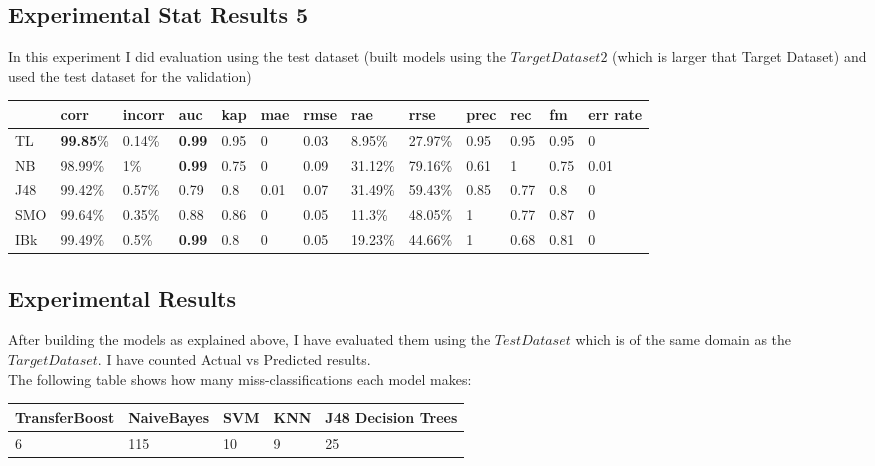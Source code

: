 \documentclass[a4paper,12pt, english]{article}
\begin{document}
\subsection{Experimental Stat Results 5}
In this experiment I did evaluation using the test dataset (built models using the $Target Dataset2$ (which is larger that Target Dataset) and used the test dataset for the validation)
\begin{small}
\begin{center}
    \begin{tabular}{ | l | l | l | l | l | l | l | l | l | l | l | l | l |}
    \hline
	& corr & incorr  & auc & kap & mae & rmse & rae & rrse & prec & rec & fm & err rate\\ \hline    
	TL & \textbf{99.85}\% & 0.14\% & \textbf{0.99} & 0.95 & 0 & 0.03 & 8.95\% & 27.97\% & 0.95 & 0.95 & 0.95 & 0\\ \hline  
	NB & 98.99\% & 1\% & \textbf{0.99} & 0.75 & 0 & 0.09 & 31.12\% & 79.16\% & 0.61 & 1 & 0.75 & 0.01\\ \hline  
	J48 & 99.42\% & 0.57\% & 0.79 & 0.8 & 0.01 & 0.07 & 31.49\% & 59.43\% & 0.85 & 0.77 & 0.8 & 0\\ \hline  
	SMO & 99.64\% & 0.35\% & 0.88 & 0.86 & 0 & 0.05 & 11.3\% & 48.05\% & 1 & 0.77 & 0.87 & 0\\ \hline  
	IBk & 99.49\% & 0.5\% & \textbf{0.99} & 0.8 & 0 & 0.05 & 19.23\% & 44.66\% & 1 & 0.68 & 0.81 & 0 \\ \hline  		    
    \end{tabular}       
\end{center}
\end{small}


\subsection{Experimental Results}
After building the models as explained above, I have evaluated them using the $Test Dataset$ which is of the same domain as the $Target Dataset$. I have counted Actual vs Predicted results.\\
The following table shows how many miss-classifications each model makes:\\ 
\begin{center}
    \begin{tabular}{ | l | l | l | p{5cm} | l |}
    \hline
    TransferBoost & NaiveBayes & SVM & KNN & J48 Decision Trees \\ \hline
    6 & 115 & 10 & 9 & 25\\
    \hline
    \end{tabular}       
\end{center}
\end{document}
